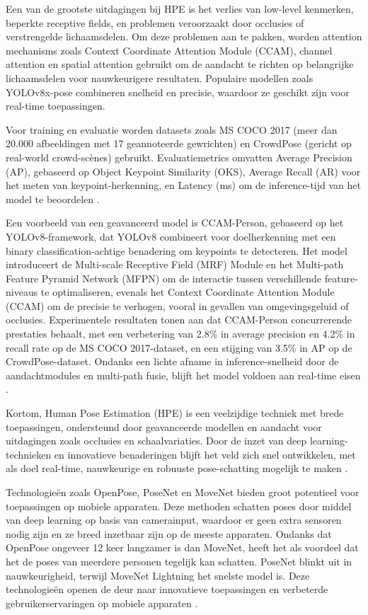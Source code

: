 Een van de grootste uitdagingen bij HPE is het verlies van low-level kenmerken, beperkte receptive fields, en problemen veroorzaakt door occlusies of verstrengelde lichaamsdelen. 
Om deze problemen aan te pakken, worden attention mechanisms zoals Context Coordinate Attention Module (CCAM), channel attention en spatial attention gebruikt om de aandacht te richten op belangrijke lichaamsdelen voor nauwkeurigere resultaten. 
Populaire modellen zoals YOLOv8x-pose combineren snelheid en precisie, waardoor ze geschikt zijn voor real-time toepassingen.

Voor training en evaluatie worden datasets zoals MS COCO 2017 (meer dan 20.000 afbeeldingen met 17 geannoteerde gewrichten) en CrowdPose (gericht op real-world crowd-scènes) gebruikt. 
Evaluatiemetrics omvatten Average Precision (AP), gebaseerd op Object Keypoint Similarity (OKS), Average Recall (AR) voor het meten van keypoint-herkenning, en Latency (ms) om de inference-tijd van het model te beoordelen \autocite{DongEtAl2024}.

Een voorbeeld van een geavanceerd model is CCAM-Person, gebaseerd op het YOLOv8-framework, dat YOLOv8 combineert voor doelherkenning met een binary classification-achtige benadering om keypoints te detecteren. Het model introduceert de Multi-scale Receptive Field (MRF) Module en het Multi-path Feature Pyramid Network (MFPN) om de interactie tussen verschillende feature-niveaus te optimaliseren, evenals het Context Coordinate Attention Module (CCAM) om de precisie te verhogen, vooral in gevallen van omgevingsgeluid of occlusies. 
Experimentele resultaten tonen aan dat CCAM-Person concurrerende prestaties behaalt, met een verbetering van 2.8\% in average precision en 4.2\% in recall rate op de MS COCO 2017-dataset, en een stijging van 3.5\% in AP op de CrowdPose-dataset. 
Ondanks een lichte afname in inference-snelheid door de aandachtmodules en multi-path fusie, blijft het model voldoen aan real-time eisen \autocite{DongEtAl2024}.

Kortom, Human Pose Estimation (HPE) is een veelzijdige techniek met brede toepassingen, ondersteund door geavanceerde modellen en aandacht voor uitdagingen zoals occlusies en schaalvariaties. 
Door de inzet van deep learning-technieken en innovatieve benaderingen blijft het veld zich snel ontwikkelen, met als doel real-time, nauwkeurige en robuuste pose-schatting mogelijk te maken \autocite{DongEtAl2024}.

Technologieën zoals OpenPose, PoseNet en MoveNet bieden groot potentieel voor toepassingen op mobiele apparaten. 
Deze methoden schatten poses door middel van deep learning op basis van camerainput, waardoor er geen extra sensoren nodig zijn en ze breed inzetbaar zijn op de meeste apparaten. 
Ondanks dat OpenPose ongeveer 12 keer langzamer is dan MoveNet, heeft het als voordeel dat het de poses van meerdere personen tegelijk kan schatten. PoseNet blinkt uit in nauwkeurigheid, terwijl MoveNet Lightning het snelste model is.
Deze technologieën openen de deur naar innovatieve toepassingen en verbeterde gebruikerservaringen op mobiele apparaten \autocite{BeomjunEtAl2022}.

